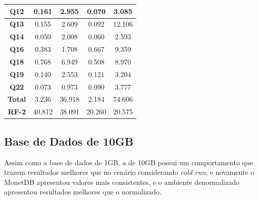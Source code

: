 \begin{table}[t]
\begin{tabular}{|c|c|c|c|c|}
                \hline
                 \textbf{Q12}         & 0.161             & 2.955                         & 0.070             & 3.085                     \\ 
                \hline
                 \textbf{Q13}         & 0.155             & 2.609                         & 0.092             & 12.106                    \\ 
                \hline
                 \textbf{Q14}         & 0.050             & 2.008                         & 0.060             & 2.593                     \\ 
                \hline
                 \textbf{Q16}         & 0.383             & 1.708                         & 0.667             & 9.359                     \\ 
                \hline
                 \textbf{Q18}         & 0.768             & 6.949                         & 0.508             & 8.970                     \\ 
                \hline
                 \textbf{Q19}         & 0.140             & 2.553                         & 0.121             & 3.204                     \\ 
                \hline
                 \textbf{Q22}         & 0.073             & 0.973                         & 0.090             & 3.777                     \\ 
                \hline
                 \textbf{Total}       & 3.236             & 36.918                        & 2.184             & 74.606                    \\ 
                \hline
                 \textbf{RF-2}        & 40.812            & 38.091                        & 20.260            & 20.575                    \\
                \hline
                \end{tabular}
                \end{table}



\subsection{Base de Dados de 10GB}

Assim como a base de dados de 1GB, a de 10GB possui um comportamento que trazem resultados melhores que no cenário considerando \textit{cold run}, e novamente o MonetDB apresentou valores mais consistentes, e o ambiente denormalizado apresentou resultados melhores que o normalizado.

